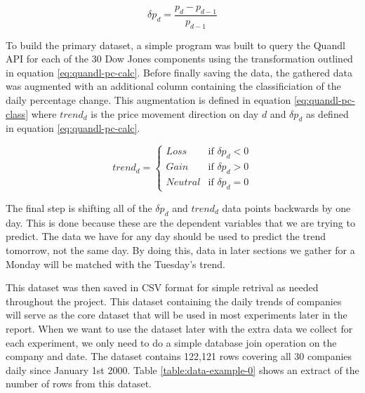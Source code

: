 \documentclass{report}
\begin{document}
\begin{figure}[H]
\begin{center}
    \begin{equation}
      \delta p_{d} = \dfrac{p_{d} - p_{d-1}} {p_{d-1}}
      \label{eq:quandl-pc-calc}
    \end{equation}
\end{center}
\end{figure}

To build the primary dataset, a simple program was built to query the Quandl API for each of the 30 Dow Jones components using the transformation outlined in equation \ref{eq:quandl-pc-calc}. Before finally saving the data, the gathered data was augmented with an additional column containing the classificiation of the daily percentage change. This augmentation is defined in equation \ref{eq:quandl-pc-class} where $trend_{d}$ is the price movement direction on day $d$ and $\delta p_{d}$ as defined in equation \ref{eq:quandl-pc-calc}.

\begin{figure}[H]
\begin{center}
\begin{equation}
trend_{d} = \begin{cases}
Loss &\text{if $\delta p_{d} < 0$}\\
Gain &\text{if $\delta p_{d} > 0$}\\
Neutral &\text{if $\delta p_{d} = 0$}
\end{cases}
\label{eq:quandl-pc-class}
\end{equation}
\end{center}
\end{figure}

The final step is shifting all of the $\delta p_{d}$ and $trend_{d}$ data points backwards by one day. This is done because these are the dependent variables that we are trying to predict. The data we have for any day should be used to predict the trend tomorrow, not the same day. By doing this, data in later sections we gather for a Monday will be matched with the Tuesday's trend.

This dataset was then saved in CSV format for simple retrival as needed throughout the project. This dataset containing the daily trends of companies will serve as the core dataset that will be used in most experiments later in the report. When we want to use the dataset later with the extra data we collect for each experiment, we only need to do a simple database join operation on the company and date. The dataset contains 122,121 rows covering all 30 companies daily since January 1st 2000. Table \ref{table:data-example-0} shows an extract of the number of rows from this dataset.
\end{document}

